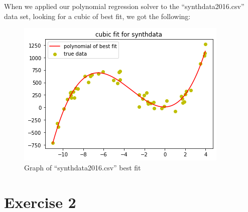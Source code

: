 \documentclass[12pt]{amsart}
\begin{document}
When we applied our polynomial regression solver to the ``synthdata2016.csv'' data set, looking for a cubic of best fit, we got the following:

\begin{figure}[H]
    \centering
    \includegraphics{Figure_synthdata.png}
    \caption{Graph of ``synthdata2016.csv'' best fit}
    \label{fig:my_label}
\end{figure}

\newpage
\section*{Exercise 2}
\end{document}
